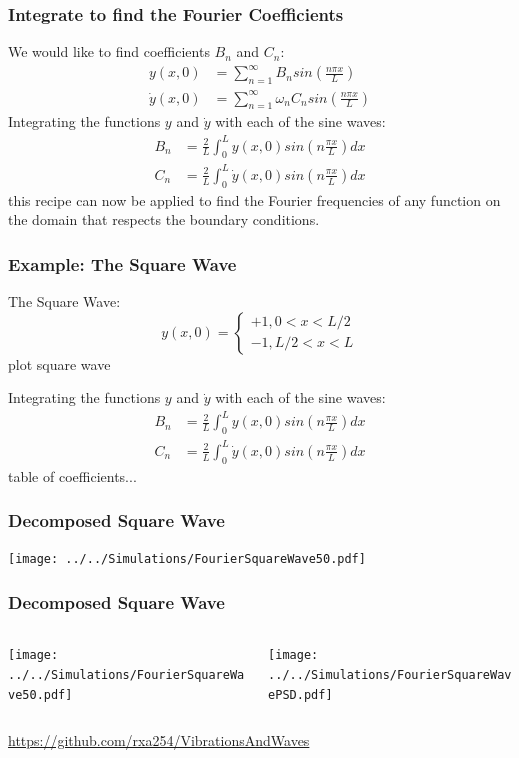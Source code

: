 \documentclass[pdf, handout, hideothersubsections]{beamer}
\begin{document}
\begin{frame}
\frametitle{Integrate to find the Fourier Coefficients}
  \pause
We would like to find coefficients $B_n$ and $C_n$:
\begin{align}
  y(x, 0) &= \sum_{n=1}^{\infty} B_n sin(\frac{n \pi x}{L}) \\
  \dot{y}(x, 0) &= \sum_{n=1}^{\infty} \omega_n C_n sin(\frac{n \pi x}{L})
\end{align}
  \pause
Integrating the functions $y$ and $\dot{y}$ with each of the sine waves:
  \pause
\begin{align}
B_n &= \frac{2}{L} \int_{0}^{L} y(x,0) sin(n \frac{\pi x}{L}) dx \\
C_n &= \frac{2}{L} \int_{0}^{L} \dot{y}(x,0) sin(n \frac{\pi x}{L}) dx
\end{align}
\pause
this recipe can now be applied to find the Fourier frequencies of any\footnotemark
function on the domain that respects the boundary conditions.


\end{frame}


\begin{frame}
\frametitle{Example: The Square Wave}
The Square Wave:
\begin{equation}
y(x,0) = \begin{cases}
+1, 0 < x < L/2 \\
-1, L/2 < x < L
\end{cases}
\end{equation}
plot square wave

Integrating the functions $y$ and $\dot{y}$ with each of the sine waves:
  \pause
\begin{align}
B_n &= \frac{2}{L} \int_{0}^{L} y(x,0) sin(n \frac{\pi x}{L}) dx \\
C_n &= \frac{2}{L} \int_{0}^{L} \dot{y}(x,0) sin(n \frac{\pi x}{L}) dx
\end{align}
table of coefficients...
\end{frame}

\begin{frame}
\frametitle{Decomposed Square Wave}

\centering
\texttt{[image: ../../Simulations/FourierSquareWave50.pdf]}


\end{frame}

\begin{frame}
\frametitle{Decomposed Square Wave}
\begin{columns}
\begin{column}{0.5\textwidth}
  \centering
  \texttt{[image: ../../Simulations/FourierSquareWave50.pdf]}
\end{column}
\begin{column}{0.5\textwidth}
  \centering
  \texttt{[image: ../../Simulations/FourierSquareWavePSD.pdf]}
\end{column}
\end{columns}

\url{https://github.com/rxa254/VibrationsAndWaves}

\end{frame}
\end{document}
